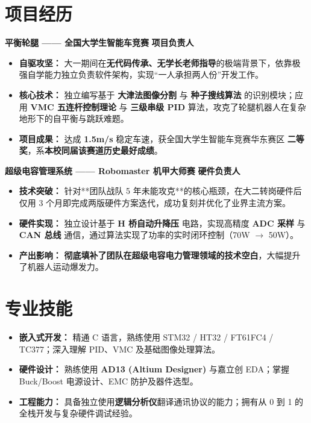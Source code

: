 \documentclass[11pt,a4paper]{article}
\begin{document}
\section{项目经历}

\textbf{平衡轮腿 —— 全国大学生智能车竞赛} \hfill \textbf{项目负责人} \\
\begin{itemize}[leftmargin=1.5em, itemsep=0pt]
    \item \textbf{自驱攻坚：} 大一期间在\textbf{无代码传承、无学长老师指导}的极端背景下，依靠极强自学能力独立负责软件架构，实现“一人承担两人份”开发工作。
    \item \textbf{核心技术：} 独立编写基于 \textbf{大津法图像分割} 与 \textbf{种子搜线算法} 的识别模块；应用 \textbf{VMC 五连杆控制理论} 与 \textbf{三级串级 PID} 算法，攻克了轮腿机器人在复杂地形下的自平衡与跳跃难题。
    \item \textbf{项目成果：} 达成 \textbf{1.5m/s} 稳定车速，获全国大学生智能车竞赛华东赛区 \textbf{二等奖}，系\textbf{本校同届该赛道历史最好成绩}。
\end{itemize}

\vspace{4ex} %

\textbf{超级电容管理系统 —— Robomaster 机甲大师赛} \hfill \textbf{硬件负责人} \\
\begin{itemize}[leftmargin=1.5em, itemsep=0pt]
    \item \textbf{技术突破：} 针对**团队战队 5 年未能攻克**的核心瓶颈，在大二转岗硬件后仅用 3 个月即完成两版硬件方案迭代，成功复刻并优化了业界主流方案。
    \item \textbf{硬件实现：} 独立设计基于 \textbf{H 桥自动升降压} 电路，实现高精度 \textbf{ADC 采样} 与 \textbf{CAN 总线} 通信，通过算法实现了功率的实时闭环控制（70W $\to$ 50W）。
    \item \textbf{产出影响：} \textbf{彻底填补了团队在超级电容电力管理领域的技术空白}，大幅提升了机器人运动爆发力。
\end{itemize}

\section{专业技能}
\begin{itemize}[leftmargin=1.5em, itemsep=0pt]
    \item \textbf{嵌入式开发：} 精通 C 语言，熟练使用 STM32 / HT32 / FT61FC4 / TC377；深入理解 PID、VMC 及基础图像处理算法。
    \item \textbf{硬件设计：} 熟练使用 \textbf{AD13 (Altium Designer)} 与嘉立创 EDA；掌握 Buck/Boost 电源设计、EMC 防护及器件选型。
    \item \textbf{工程能力：} 具备独立使用\textbf{逻辑分析仪}翻译通讯协议的能力；拥有从 0 到 1 的全栈开发与复杂硬件调试经验。
\end{itemize}
\end{document}
